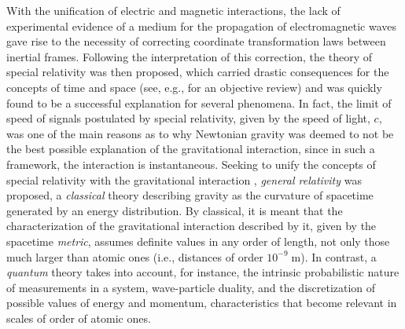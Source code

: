 \documentclass[
12pt,		%
openright,	%
twoside,  %
a4paper,			%
chapter=TITLE,		%
english,			%
french,				%
spanish,			%
brazil				%
]{USPSC-classe/USPSC}
\begin{document}
With the unification of electric and magnetic interactions, the lack of experimental evidence of a medium for the propagation of electromagnetic waves gave rise to the necessity of correcting coordinate transformation laws between inertial frames. Following the interpretation of this correction, the theory of special relativity was then proposed, which carried drastic consequences for the concepts of time and space (see, e.g., \cite{Wald1984} for an objective review) and was quickly found to be a successful explanation for several phenomena. In fact, the limit of speed of signals postulated by special relativity, given by the speed of light, $c$, was one of the main reasons as to why Newtonian gravity was deemed to not be the best possible explanation of the gravitational interaction, since in such a framework, the interaction is instantaneous. Seeking to unify the concepts of special relativity with the gravitational interaction \cite{Misner1973}, \textit{general relativity} \cite{Einstein1916} was proposed, a \textit{classical} theory describing gravity as the curvature of spacetime generated by an energy distribution. By classical, it is meant that the characterization of the gravitational interaction described by it, given by the spacetime \textit{metric}, assumes definite values in any order of length, not only those much larger than atomic ones (i.e., distances of order $10^{-9}\;\text{m}$). In contrast, a \textit{quantum} theory takes into account, for instance, the intrinsic probabilistic nature of measurements in a system, wave-particle duality, and the discretization of possible values of energy and momentum, characteristics that become relevant in scales of order of atomic ones.
\end{document}
